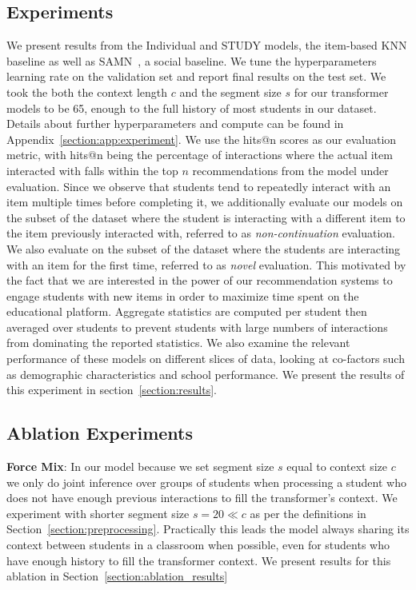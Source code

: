 \documentclass{article}
\begin{document}
\subsection{Experiments}
\label{sec:experiments}
We present results from the Individual and STUDY models, the item-based KNN baseline as well as SAMN~\cite{chen2019social}, a social baseline.  We tune the hyperparameters learning rate on the validation set and report final results on the test set. We took the both the context length $c$ and the segment size $s$ for our transformer models to be 65, enough to the full history of most students in our dataset. Details about further hyperparameters and compute can be found in Appendix~\ref{section:app:experiment}. We use the hits@n scores as our evaluation metric, with hits@n being the percentage of interactions where the actual item interacted with falls within the top $n$ recommendations from the model under evaluation. Since we observe that students tend to repeatedly interact with an item multiple times before completing it, we additionally evaluate our models on the subset of the dataset where the student is interacting with a different item to the item previously interacted with, referred to as \textit{non-continuation} evaluation. We also evaluate on the subset of the dataset where the students are interacting with an item for the first time, referred to as \textit{novel} evaluation. This motivated by the fact that we are interested in the power of our recommendation systems to engage students with new items in order to maximize time spent on the educational platform. Aggregate statistics are computed per student then averaged over students to prevent students with large numbers of interactions from dominating the reported statistics. We also examine the relevant performance of these models on different slices of data, looking at co-factors such as demographic characteristics and school performance. We present the results of this experiment in section~\ref{section:results}.

\subsection{Ablation Experiments}
\textbf{Force Mix}: In our model because we set segment size $s$ equal to context size $c$ we only do joint inference over groups of students when processing a student who does not have enough previous interactions to fill the transformer's context. We experiment with shorter segment size $s = 20 \ll c$ as per the definitions in Section~\ref{section:preprocessing}. Practically this leads the model always sharing its context between students in a classroom when possible, even for students who have enough history to fill the transformer context. We present results for this ablation in Section~\ref{section:ablation_results} 
\end{document}
